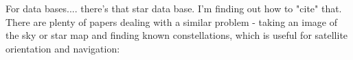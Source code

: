 \documentclass{article}
\begin{document}
For data bases.... there's that star data base. I'm finding out how to "cite" that.
There are plenty of papers dealing with a similar problem - taking an image of the sky or star map and finding known constellations, which is useful for satellite orientation and navigation:
\\\\
\\\\
\\\\
\end{document}
